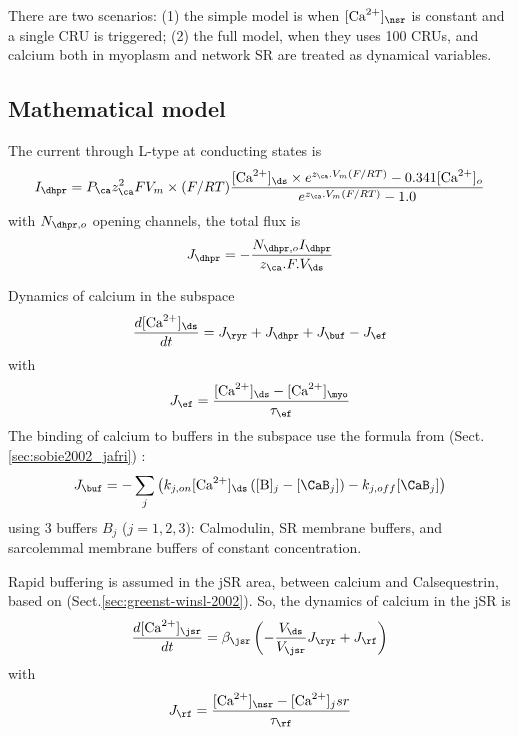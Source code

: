 There are two scenarios: (1) the simple model is when $[\Ca]_\nsr$ is constant
and a single CRU is triggered; (2) the full model, when they uses 100 CRUs, and
calcium both in myoplasm and network SR are treated as dynamical variables.



\subsection{Mathematical model}

The current through L-type at conducting
states is
\begin{equation}
I_\dhpr = P_\ca z_\ca^2 FV_m \times (F/RT) \frac{[\Ca]_\ds \times
e^{z_\ca.V_m(F/RT)} - 0.341[\Ca]_o }{e^{z_\ca.V_m(F/RT)}-1.0}
\end{equation}
with $N_{\dhpr,o}$ opening channels, the total flux is 
\begin{equation}
J_\dhpr = - \frac{N_{\dhpr,o}I_\dhpr}{z_\ca.F.V_\ds}
\end{equation}

Dynamics of calcium in the subspace
\begin{equation}
\frac{d[\Ca]_\ds}{dt} = J_\ryr + J_\dhpr + J_\buf - J_\ef
\end{equation}
with 
\begin{equation}
J_\ef = \frac{[\Ca]_\ds	- [\Ca]_\myo}{\tau_\ef}
\end{equation}
The binding of calcium to buffers in the subspace use the formula from
\citep{sobie2002tcas} (Sect.\ref{sec:sobie2002_jafri}) : 
\begin{equation}
J_\buf = - \sum_j \left( k_{j,on}[\Ca]_\ds\left([\B]_j-[\CaB_j] \right) -
k_{j,off}[\CaB_j] \right)
\end{equation}
using 3 buffers $B_j$ ($j=1,2,3$): Calmodulin, SR membrane buffers, and
sarcolemmal membrane buffers of constant concentration.


Rapid buffering is assumed in the jSR area, between calcium and Calsequestrin,
based on \citep{greenstein2002} (Sect.\ref{sec:greenst-winsl-2002}). So, the
dynamics of calcium in the jSR is
\begin{equation}
\frac{d[\Ca]_\jsr}{dt} = \beta_\jsr\left( -\frac{V_\ds}{V_\jsr}J_\ryr +
J_\rf \right)
\end{equation}
with 
\begin{equation}
J_\rf = \frac{[\Ca]_\nsr - [\Ca]_jsr}{\tau_\rf}
\end{equation}


